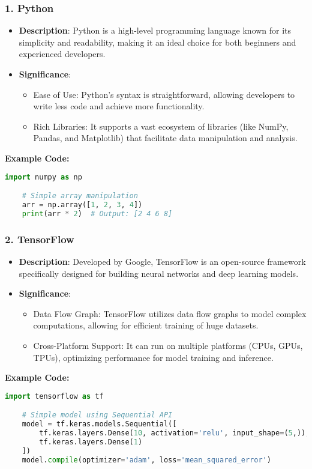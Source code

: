 \documentclass[aspectratio=169]{beamer}
\begin{document}
\begin{frame}[fragile]
    \frametitle{1. Python}
    \begin{itemize}
        \item \textbf{Description}: Python is a high-level programming language known for its simplicity and readability, making it an ideal choice for both beginners and experienced developers.
        
        \item \textbf{Significance}:
        \begin{itemize}
            \item Ease of Use: Python's syntax is straightforward, allowing developers to write less code and achieve more functionality.
            \item Rich Libraries: It supports a vast ecosystem of libraries (like NumPy, Pandas, and Matplotlib) that facilitate data manipulation and analysis.
        \end{itemize}
    \end{itemize}

    \textbf{Example Code:}
    \begin{lstlisting}[language=Python]
    import numpy as np

    # Simple array manipulation
    arr = np.array([1, 2, 3, 4])
    print(arr * 2)  # Output: [2 4 6 8]
    \end{lstlisting}
\end{frame}

\begin{frame}[fragile]
    \frametitle{2. TensorFlow}
    \begin{itemize}
        \item \textbf{Description}: Developed by Google, TensorFlow is an open-source framework specifically designed for building neural networks and deep learning models.
        
        \item \textbf{Significance}:
        \begin{itemize}
            \item Data Flow Graph: TensorFlow utilizes data flow graphs to model complex computations, allowing for efficient training of huge datasets.
            \item Cross-Platform Support: It can run on multiple platforms (CPUs, GPUs, TPUs), optimizing performance for model training and inference.
        \end{itemize}
    \end{itemize}

    \textbf{Example Code:}
    \begin{lstlisting}[language=Python]
    import tensorflow as tf

    # Simple model using Sequential API
    model = tf.keras.models.Sequential([
        tf.keras.layers.Dense(10, activation='relu', input_shape=(5,)),
        tf.keras.layers.Dense(1)
    ])
    model.compile(optimizer='adam', loss='mean_squared_error')
    \end{lstlisting}
\end{frame}
\end{document}
